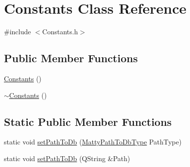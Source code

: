 \hypertarget{classConstants}{}\section{Constants Class Reference}
\label{classConstants}


{\ttfamily \#include $<$Constants.\+h$>$}

\subsection*{Public Member Functions}
\begin{DoxyCompactItemize}
\item 
\hyperlink{classConstants_af395b3c1d6f0577f4880a21a257aa1db}{Constants} ()
\item 
\hyperlink{classConstants_a2dce6c6db3f1ba4114550606fae1765a}{$\sim$\+Constants} ()
\end{DoxyCompactItemize}
\subsection*{Static Public Member Functions}
\begin{DoxyCompactItemize}
\item 
static void \hyperlink{classConstants_a3d474cb2c4e964cb64ab6f2db6e1bf92}{set\+Path\+To\+Db} (\hyperlink{Constants_8h_a9558e0854b1cdaf803f7a80df80ab91b}{Matty\+Path\+To\+Db\+Type} Path\+Type)
\item 
static void \hyperlink{classConstants_ab9a63f6d49de9a335b18e5ac543ec0fc}{set\+Path\+To\+Db} (Q\+String \&Path)
\end{DoxyCompactItemize}
